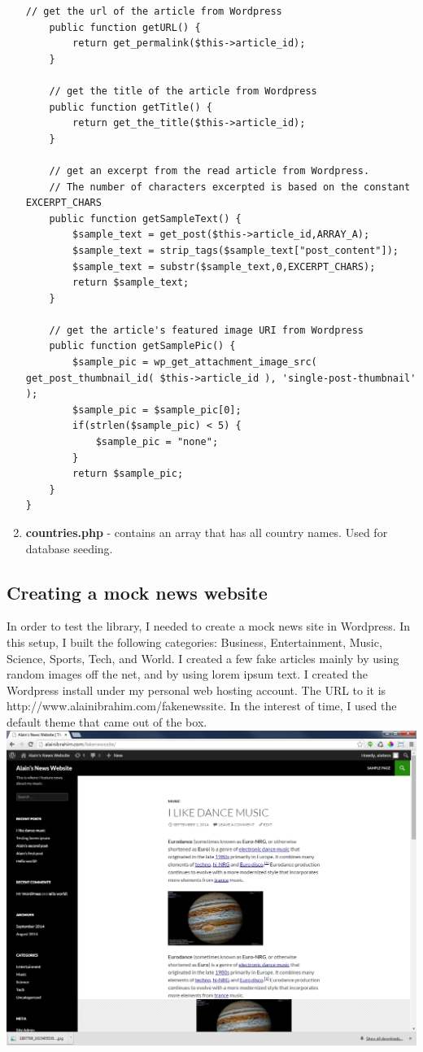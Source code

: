 \documentclass[12pt]{article}
\begin{document}
\begin{enumerate}
\begin{lstlisting}[basicstyle=\scriptsize]
	// get the url of the article from Wordpress
	public function getURL() {
		return get_permalink($this->article_id);		
	}
	
	// get the title of the article from Wordpress
	public function getTitle() {
		return get_the_title($this->article_id);		
	}
	
	// get an excerpt from the read article from Wordpress. 
	// The number of characters excerpted is based on the constant EXCERPT_CHARS
	public function getSampleText() {
		$sample_text = get_post($this->article_id,ARRAY_A);
		$sample_text = strip_tags($sample_text["post_content"]);
		$sample_text = substr($sample_text,0,EXCERPT_CHARS);
		return $sample_text;
	}
	
	// get the article's featured image URI from Wordpress
	public function getSamplePic() {
		$sample_pic = wp_get_attachment_image_src( get_post_thumbnail_id( $this->article_id ), 'single-post-thumbnail' );
		$sample_pic = $sample_pic[0];
		if(strlen($sample_pic) < 5) {
			$sample_pic = "none";
		}
		return $sample_pic;
	}
}
\end{lstlisting}
\item \textbf{countries.php} - contains an array that has all country names. Used for database seeding.
\end{enumerate}
\subsection{Creating a mock news website}
In order to test the library, I needed to create a mock news site in Wordpress. In this setup, I built the following categories: Business, Entertainment, Music, Science, Sports, Tech, and World. I created a few fake articles mainly by using random images off the net, and by using lorem ipsum text. I created the Wordpress install under my personal web hosting account. The URL to it is http://www.alainibrahim.com/fakenewssite. In the interest of time, I used the default theme that came out of the box. \\

\noindent\includegraphics[scale=0.5]{img/fakenewssite_main} 
\end{document}
